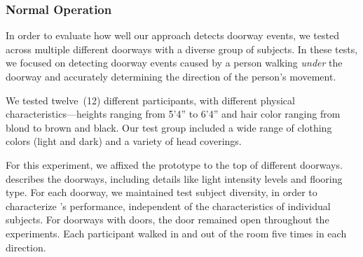 



\subsubsection{Normal Operation}
\label{sec:normal_operation}

In order to evaluate how well our approach detects doorway events, we tested \sysname across multiple different doorways with a diverse group of subjects.
In these tests, we focused on detecting doorway events caused by a person walking \textit{under} the doorway and accurately determining the direction of the person's movement.

We tested twelve~(12) different participants, with different physical characteristics---heights ranging from 5'4'' to 6'4'' and hair color ranging from blond to brown and black.
Our test group included a wide range of clothing colors (light and dark) and a variety of head coverings.


For this experiment, we affixed the \sysname prototype to the top of \numDoors different doorways.
 describes the doorways, including details like light intensity levels and flooring type.
For each doorway, we maintained test subject diversity, in order to characterize \sysname's performance, independent of the characteristics of individual subjects.
For doorways with doors, the door remained open throughout the experiments.
Each participant walked in and out of the room five times in each direction.

